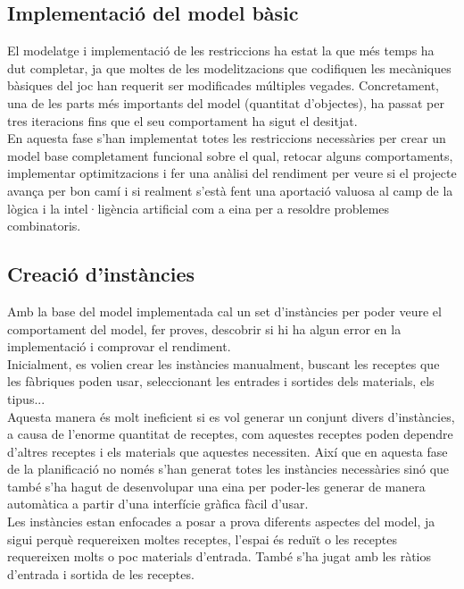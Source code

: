 \subsection{Implementació del model bàsic}
El modelatge i implementació de les restriccions ha estat la que més temps ha dut completar, ja que moltes de les modelitzacions que codifiquen les mecàniques bàsiques del joc han requerit ser modificades múltiples vegades. Concretament, una de les parts més importants del model (quantitat d'objectes), ha passat per tres iteracions fins que el seu comportament ha sigut el desitjat.\\
En aquesta fase s'han implementat totes les restriccions necessàries per crear un model base completament funcional sobre el qual, retocar alguns comportaments, implementar optimitzacions i fer una anàlisi del rendiment per veure si el projecte avança per bon camí i si realment s'està fent una aportació valuosa al camp de la lògica i la intel·ligència artificial com a eina per a resoldre problemes combinatoris.

\subsection{Creació d'instàncies}
Amb la base del model implementada cal un set d'instàncies per poder veure el comportament del model, fer proves, descobrir si hi ha algun error en la implementació i comprovar el rendiment.\\
Inicialment, es volien crear les instàncies manualment, buscant les receptes que les fàbriques poden usar, seleccionant les entrades i sortides dels materials, els tipus...\\
Aquesta manera és molt ineficient si es vol generar un conjunt divers d'instàncies, a causa de l'enorme quantitat de receptes, com aquestes receptes poden dependre d'altres receptes i els materials que aquestes necessiten. Així que en aquesta fase de la planificació no només s'han generat totes les instàncies necessàries sinó que també s'ha hagut de desenvolupar una eina per poder-les generar de manera automàtica a partir d'una interfície gràfica fàcil d'usar.\\
Les instàncies estan enfocades a posar a prova diferents aspectes del model, ja sigui perquè requereixen moltes receptes, l'espai és reduït o les receptes requereixen molts o poc materials d'entrada. També s'ha jugat amb les ràtios d'entrada i sortida de les receptes.

